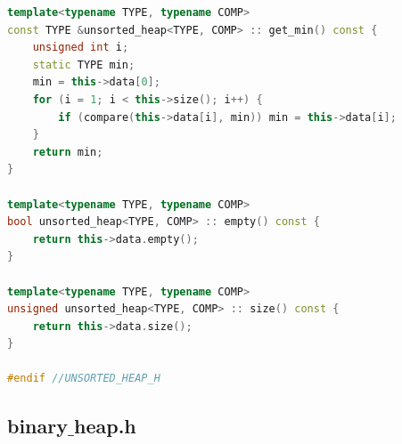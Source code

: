 \documentclass[a4paper]{article}
\begin{document}
\begin{lstlisting}[language=C++]
template<typename TYPE, typename COMP>
const TYPE &unsorted_heap<TYPE, COMP> :: get_min() const {
	unsigned int i;
	static TYPE min;
	min = this->data[0];
	for (i = 1; i < this->size(); i++) {
		if (compare(this->data[i], min)) min = this->data[i];
	}
	return min;
}

template<typename TYPE, typename COMP>
bool unsorted_heap<TYPE, COMP> :: empty() const {
	return this->data.empty();
}

template<typename TYPE, typename COMP>
unsigned unsorted_heap<TYPE, COMP> :: size() const { 
	return this->data.size();
}

#endif //UNSORTED_HEAP_H
\end{lstlisting}

\subsection{binary$\_{}$heap.h}
\end{document}

